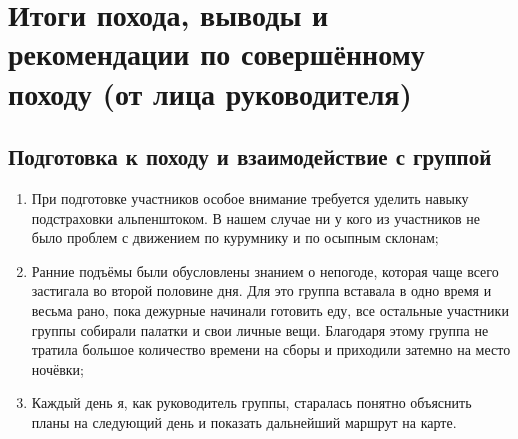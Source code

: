 \section{Итоги похода, выводы и рекомендации по совершённому походу (от лица руководителя)}

\subsection{Подготовка к походу и взаимодействие с группой} 
	\begin{enumerate}
		\item При подготовке участников особое внимание требуется уделить навыку подстраховки альпенштоком. В нашем случае ни у кого из участников не было проблем с движением по курумнику и по осыпным склонам;
		\item Ранние подъёмы были обусловлены знанием о непогоде, которая чаще всего застигала во второй половине дня. Для это группа вставала в одно время и весьма рано, пока дежурные начинали готовить еду, все остальные участники группы собирали палатки и свои личные вещи. Благодаря этому группа не тратила большое количество времени на сборы и приходили затемно на место ночёвки;
		\item Каждый день я, как руководитель группы, старалась понятно объяснить планы на следующий день и показать дальнейший маршрут на карте.
	\end{enumerate} 
	
